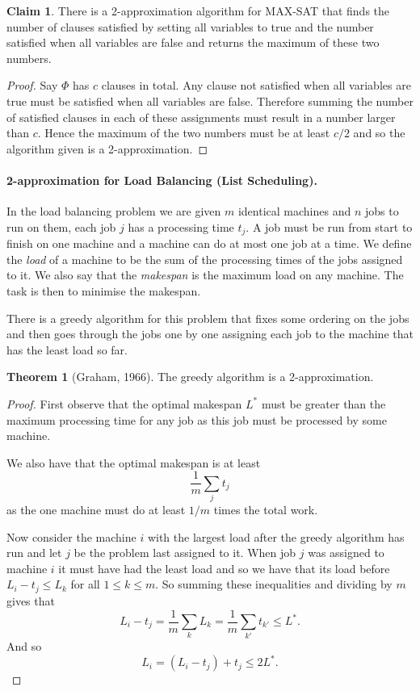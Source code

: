 \documentclass[11pt,a4paper]{article}
\theoremstyle{definition}
\newtheorem{thm}{Theorem}
\newtheorem{claim}{Claim}
\begin{document}
\begin{claim}
There is a 2-approximation algorithm for MAX-SAT that finds the number of clauses satisfied by setting all variables to true and the number satisfied when all variables are false and returns the maximum of these two numbers.
\end{claim}
\begin{proof}
Say $\Phi$ has $c$ clauses in total.
Any clause not satisfied when all variables are true must be satisfied when all variables are false.
Therefore summing the number of satisfied clauses in each of these assignments must result in a number larger than $c$.
Hence the maximum of the two numbers must be at least $c/2$ and so the algorithm given is a 2-approximation.
\end{proof}

\paragraph{2-approximation for Load Balancing (List Scheduling).}
In the load balancing problem we are given $m$ identical machines and $n$ jobs to run on them, each job $j$ has a processing time $t_j$.
A job must be run from start to finish on one machine and a machine can do at most one job at a time.
We define the \emph{load} of a machine to be the sum of the processing times of the jobs assigned to it.
We also say that the \emph{makespan} is the maximum load on any machine.
The task is then to minimise the makespan.

There is a greedy algorithm for this problem that fixes some ordering on the jobs and then goes through the jobs one by one assigning each job to the machine that has the least load so far.

\begin{thm}[Graham, 1966]
The greedy algorithm is a 2-approximation.
\end{thm}
\begin{proof}
First observe that the optimal makespan $L^*$ must be greater than the maximum processing time for any job as this job must be processed by some machine.

We also have that the optimal makespan is at least
\[
\frac{1}{m}\sum_{j} t_j
\]
as the one machine must do at least $1/m$ times the total work.

Now consider the machine $i$ with the largest load after the greedy algorithm has run and let $j$ be the problem last assigned to it.
When job $j$ was assigned to machine $i$ it must have had the least load and so we have that its load before $L_i - t_j \le L_k$ for all $1 \le k \le m$.
So summing these inequalities and dividing by $m$ gives that
\[
L_i - t_j = \frac{1}{m}\sum_{k} L_k = \frac{1}{m}\sum_{k'} t_{k'} \le L^*.
\]
And so
\[
L_i = (L_i - t_j) + t_j \le 2L^*.
\]
\end{proof}
\end{document}
